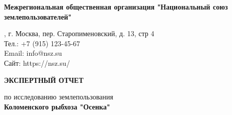 \begin{titlepage}
    \begin{center}
        \setlength{\baselineskip}{1.3\baselineskip}
        \setlength{\parskip}{0.5\baselineskip} %
        
        
        \vspace{0.5cm}
        
        {\fontsize{16}{18}\selectfont \textbf{Межрегиональная общественная организация "Национальный союз землепользователей"}}
        
        \vspace{0cm} %
        
        {\fontsize{12}{14}, г. Москва, пер. Старопименовский, д. 13, стр 4\\[3pt] %
        Тел.: +7 (915) 123-45-67\\[3pt]
        Email: info@nsz.su\\[3pt]
        Сайт: https://nsz.su/}
        
        \vspace{1cm} %
        
        {\fontsize{20}{24}\selectfont \textbf{ЭКСПЕРТНЫЙ ОТЧЕТ}}
        
        \vspace{0.5cm} %
        
        {\fontsize{16}{18}\selectfont 
        по исследованию землепользования\\[5pt] %
        \textbf{Коломенского рыбхоза "Осенка"}}
        

\end{center}
\end{titlepage}
